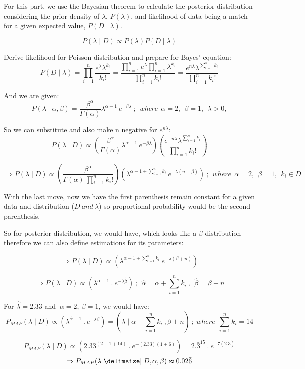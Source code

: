 \documentclass{homeworg}
\begin{document}
For this part, we use the Bayesian theorem to calculate the posterior distribution
considering the prior density of $\lambda$, $P(\lambda)$, and likelihood of data
being a match for a given expected value, $P(D \mid \lambda)$.

$$
P(\lambda \mid D) \propto P(\lambda)P(D \mid \lambda)
$$

Derive likelihood for Poisson distribution and prepare for Bayes' equation:
$$
P(D \mid \lambda) = \prod_{i = 1}^{n} \frac{e^{\lambda} \lambda^{k_i}}{k_{i}!}
= \frac{\prod_{i=1}^{n}e^{\lambda}\prod_{i=1}^{n}\lambda^{k_i}}{\prod_{i=1}^{n}k_{i}!}
= \frac{e^{n\lambda}\lambda^{\sum_{i=1}^{n}k_i}}{\prod_{i=1}^{n}k_{i}!}
$$

And we are given:
$$
P(\lambda \mid \alpha, \beta) = \frac{\beta^{\alpha}}{\Gamma(\alpha)}\lambda^{\alpha-1}~e^{-\beta\lambda}
~;~~where ~~\alpha= 2, ~~\beta=1, ~~\lambda>0,
$$

So we can substitute and also make n negative for $e^{n\lambda}$:
$$
P(\lambda \mid D) \propto
(\frac{\beta^{\alpha}}{\Gamma(\alpha)} \lambda^{\alpha-1}~e^{-\beta\lambda})
(\frac{e^{-n\lambda}\lambda^{\sum_{i=1}^{n}k_i}}{\prod_{i=1}^{n}k_{i}!})
$$

$$
\Rightarrow
P(\lambda \mid D) \propto
(\frac{\beta^{\alpha}}{\Gamma(\alpha)~\prod_{i=1}^{n}k_{i}!})
(\lambda^{\alpha-1+\sum_{i=1}^{n}k_i}~e^{-\lambda(n+\beta)})
~;~~where ~~\alpha= 2, ~~\beta=1,~~ k_i \in D
$$

With the last move, now we have the first parenthesis remain constant for a given
data and distribution ($D~and~\lambda$) so proportional probability would be
the second parenthesis.

So for posterior distribution, we would have, which looks like a $\beta$
distribution therefore we can also define estimations for its parameters:

$$
\Rightarrow
P(\lambda \mid D) \propto (\lambda^{\alpha-1+\sum_{i=1}^{n}k_i}~e^{-\lambda(\beta+n)})
$$

$$
\Rightarrow
P(\lambda \mid D) \propto (\lambda^{\hat{\alpha}-1}~.~e^{-\lambda\hat{\beta}})~;~~
\hat{\alpha} =\alpha +\sum_{i=1}^{n}k_i~, ~~\hat{\beta} = \beta+n
$$

\newpage

For $\hat{\lambda} = 2.33$ and $~\alpha= 2, ~\beta=1$, we would have:
$$
P_{MAP}(\lambda \mid D) \propto (\lambda^{\hat{\alpha}-1}~.~e^{-\lambda\hat{\beta}})
= (\lambda \mid \alpha +\sum_{i=1}^{n}k_i~, \beta+n)~;
~where~~ \sum_{i=1}^{n}k_i= 14
$$

$$
P_{MAP}(\lambda \mid D) \propto (2.33^{(2-1+14)}~.~e^{-(2.33)(1 + 6)}) =
2.\bar{3}^{15}~.~e^{-7(2.\bar{3})}
$$
$$
\Rightarrow P_{MAP}(\lambda \mid D, \alpha, \beta) \thickapprox  0.02\bar{6}
$$
\exercise*
\end{document}
